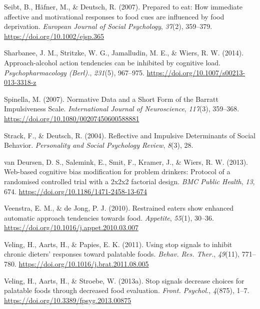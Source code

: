 \documentclass[man,floatsintext]{apa6}
\begin{document}
\leavevmode\hypertarget{ref-seibt_prepared_2007-1}{}%
Seibt, B., Häfner, M., \& Deutsch, R. (2007). Prepared to eat: How immediate affective and motivational responses to food cues are influenced by food deprivation. \emph{European Journal of Social Psychology}, \emph{37}(2), 359--379. \url{https://doi.org/10.1002/ejsp.365}

\leavevmode\hypertarget{ref-sharbanee_approach-alcohol_2014}{}%
Sharbanee, J. M., Stritzke, W. G., Jamalludin, M. E., \& Wiers, R. W. (2014). Approach-alcohol action tendencies can be inhibited by cognitive load. \emph{Psychopharmacology (Berl).}, \emph{231}(5), 967--975. \url{https://doi.org/10.1007/s00213-013-3318-z}

\leavevmode\hypertarget{ref-spinella_normative_2007}{}%
Spinella, M. (2007). Normative Data and a Short Form of the Barratt Impulsiveness Scale. \emph{International Journal of Neuroscience}, \emph{117}(3), 359--368. \url{https://doi.org/10.1080/00207450600588881}

\leavevmode\hypertarget{ref-strack_reflective_2004}{}%
Strack, F., \& Deutsch, R. (2004). Reflective and Impulsive Determinants of Social Behavior. \emph{Personality and Social Psychology Review}, \emph{8}(3), 28.

\leavevmode\hypertarget{ref-van_deursen_web-based_2013}{}%
van Deursen, D. S., Salemink, E., Smit, F., Kramer, J., \& Wiers, R. W. (2013). Web-based cognitive bias modification for problem drinkers: Protocol of a randomised controlled trial with a 2x2x2 factorial design. \emph{BMC Public Health}, \emph{13}, 674. \url{https://doi.org/10.1186/1471-2458-13-674}

\leavevmode\hypertarget{ref-veenstra_restrained_2010}{}%
Veenstra, E. M., \& de Jong, P. J. (2010). Restrained eaters show enhanced automatic approach tendencies towards food. \emph{Appetite}, \emph{55}(1), 30--36. \url{https://doi.org/10.1016/j.appet.2010.03.007}

\leavevmode\hypertarget{ref-veling_using_2011}{}%
Veling, H., Aarts, H., \& Papies, E. K. (2011). Using stop signals to inhibit chronic dieters' responses toward palatable foods. \emph{Behav. Res. Ther.}, \emph{49}(11), 771--780. \url{https://doi.org/10.1016/j.brat.2011.08.005}

\leavevmode\hypertarget{ref-veling_stop_2013}{}%
Veling, H., Aarts, H., \& Stroebe, W. (2013a). Stop signals decrease choices for palatable foods through decreased food evaluation. \emph{Front. Psychol.}, \emph{4}(875), 1--7. \url{https://doi.org/10.3389/fpsyg.2013.00875}
\end{document}
